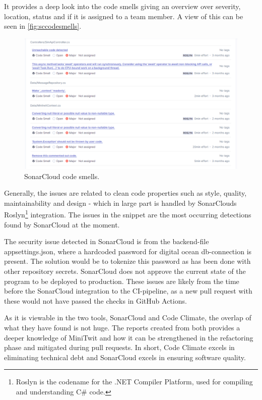 It provides a deep look into the code smells giving an overview over severity, location, status and if it is assigned to a team member. A view of this can be seen in \autoref{fig:sccodesmells}.

\begin{figure}[H]
    \includegraphics[width=\textwidth]{resources/sonarclouddeep}
    \caption{SonarCloud code smells.}
    \label{fig:sccodesmells}
\end{figure}

Generally, the issues are related to clean code properties such as style, quality, maintainability and design - which in large part is handled by SonarClouds Roslyn\footnote{Roslyn is the codename for the .NET Compiler Platform, used for compiling and understanding C\# code.} integration. The issues in the snippet are the most occurring detections found by SonarCloud at the moment.

The security issue detected in SonarCloud is from the backend-file appsettings.json, where a hardcoded password for digital ocean db-connection is present. The solution would be to tokenize this password as has been done with other repository secrets. SonarCloud does not approve the current state of the program to be deployed to production. These issues are likely from the time before the SonarCloud integration to the CI-pipeline, as a new pull request with these would not have passed the checks in GitHub Actions.

As it is viewable in the two tools, SonarCloud and Code Climate, the overlap of what they have found is not huge. The reports created from both provides a deeper knowledge of MiniTwit and how it can be strengthened in the refactoring phase and mitigated during pull requests. In short, Code Climate excels in eliminating technical debt and SonarCloud excels in ensuring software quality. 